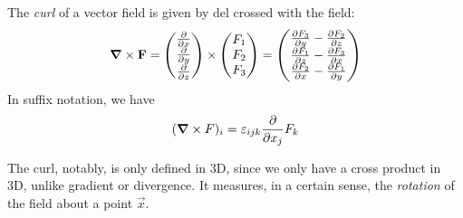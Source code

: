 \documentclass{../../template/note}
\begin{document}
    \begin{definition*}
        The \emph{curl} of a vector field is given by del crossed with the field:
        \begin{align*}
            \curl \vec F = \begin{pmatrix}
             \pd{}{x} \\
             \pd{}{y} \\
             \pd{}{z} \\
            \end{pmatrix} \times \begin{pmatrix}
             F_1 \\
             F_2 \\
             F_3 \\
            \end{pmatrix} = \begin{pmatrix}
             \pd{F_3}{y} - \pd{F_2}{z} \\
             \pd{F_1}{z} - \pd{F_3}{x} \\
             \pd{F_2}{x} - \pd{F_1}{y} \\
            \end{pmatrix}
        \end{align*}
        In suffix notation, we have
        \begin{align*}
            (\curl F)_i = \lv{ijk} \pd{}{x_j} F_k
        \end{align*}
        
        
    \end{definition*}
    
    The curl, notably, is only defined in 3D, since we only have a cross product in 3D, unlike gradient or divergence. It measures, in a certain sense, the \emph{rotation} of the field about a point \(\vec x\).
\end{document}
